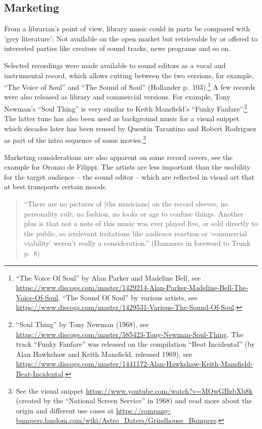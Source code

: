 \documentclass[a4paper,
fontsize=11pt,
oneside,
numbers=noperiodatend,
parskip=half-,
bibliography=totoc,
final
]{scrartcl}
\begin{document}
\hypertarget{marketing}{%
\subsection{Marketing}\label{marketing}}

From a librarian's point of view, library music could in parts be
compared with \enquote*{grey literature}: Not available on the open
market but retrievable by or offered to interested parties like creators
of sound tracks, news programs and so on.

Selected recordings were made available to sound editors as a vocal and
instrumental record, which allows cutting between the two versions, for
example, \enquote{The Voice of Soul} and \enquote{The Sound of Soul}
(Hollander p.~103).\footnote{\enquote{The Voice Of Soul} by Alan Parker
  and Madeline Bell, see
  \url{https://www.discogs.com/master/1429214-Alan-Parker-Madeline-Bell-The-Voice-Of-Soul}.
  \enquote{The Sound Of Soul} by various artists, see
  \url{https://www.discogs.com/master/1429531-Various-The-Sound-Of-Soul}.}
A few records were also released as library and commercial versions. For
example, Tony Newman's \enquote{Soul Thing} is very similar to Keith
Mansfield's \enquote{Funky Fanfare}.\footnote{\enquote{Soul Thing} by
  Tony Newman (1968), see
  \url{https://www.discogs.com/master/585423-Tony-Newman-Soul-Thing}.
  The track \enquote{Funky Fanfare} was released on the compilation
  \enquote{Beat Incidental} (by Alan Hawkshaw and Keith Mansfield,
  released 1969), see
  \url{https://www.discogs.com/master/1441172-Alan-Hawkshaw-Keith-Mansfield-Beat-Incidental}.}
The latter tune has also been used as background music for a visual
snippet which decades later has been reused by Quentin Tarantino and
Robert Rodriguez as part of the intro sequence of some
movies.\footnote{See the visual snippet
  \url{https://www.youtube.com/watch?v=MOwGBzbXb8k} (created by the
  \enquote{National Screen Service} in 1968) and read more about the
  origin and different use cases at
  \url{https://company-bumpers.fandom.com/wiki/Astro_Daters/Grindhouse_Bumpers}.}

Marketing considerations are also apparent on some record covers, see
the example for Oronzo de Filippi. The artists are less important than
the usability for the target audience -- the sound editor -- which are
reflected in visual art that at best transports certain moods.

\begin{quote}
\enquote{There are no pictures of {[}the musicians{]} on the record
sleeves, no personality cult, no fashion, no looks or age to confuse
things. Another plus is that not a note of this music was ever played
live, or sold directly to the public, so irrelevant irritations like
audience reaction or \enquote*{commercial viability} weren't really a
consideration.} (Dammers in foreword to Trunk p.~8)
\end{quote}
\end{document}

